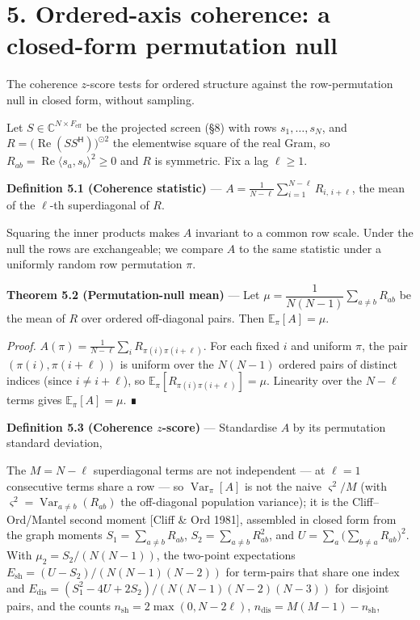 \documentclass[10pt,letterpaper,twocolumn]{article}
\begin{document}
\section{5. Ordered-axis coherence: a closed-form permutation null}\label{5-ordered-axis-coherence-a-closed-form-permutation-null}

The coherence \(z\)-score tests for ordered structure against the row-permutation null in closed form, without sampling.

Let \(S\in\mathbb{C}^{N\times F_{\mathrm{eff}}}\) be the projected screen (§8) with rows \(s_1,\dots,s_N\), and \(R=\big(\operatorname{Re}(SS^{\mathsf H})\big)^{\odot2}\) the elementwise square of the real Gram, so \(R_{ab}=\operatorname{Re}\langle s_a,s_b\rangle^2\ge0\) and \(R\) is symmetric. Fix a lag \(\ell\ge1\).

\textbf{Definition 5.1 (Coherence statistic)} --- \(\textstyle A=\frac1{N-\ell}\sum_{i=1}^{N-\ell}R_{i,\,i+\ell}\), the mean of the \(\ell\)-th superdiagonal of \(R\).

Squaring the inner products makes \(A\) invariant to a common row scale. Under the null the rows are exchangeable; we compare \(A\) to the same statistic under a uniformly random row permutation \(\pi\).

\textbf{Theorem 5.2 (Permutation-null mean)} --- Let \(\mu=\dfrac1{N(N-1)}\sum_{a\ne b}R_{ab}\) be the mean of \(R\) over ordered off-diagonal pairs. Then \(\mathbb{E}_\pi[A]=\mu\).

\emph{Proof.} \(A(\pi)=\frac1{N-\ell}\sum_i R_{\pi(i)\pi(i+\ell)}\). For each fixed \(i\) and uniform \(\pi\), the pair \((\pi(i),\pi(i+\ell))\) is uniform over the \(N(N-1)\) ordered pairs of distinct indices (since \(i\ne i+\ell\)), so \(\mathbb{E}_\pi[R_{\pi(i)\pi(i+\ell)}]=\mu\). Linearity over the \(N-\ell\) terms gives \(\mathbb{E}_\pi[A]=\mu\). ∎

\textbf{Definition 5.3 (Coherence \(z\)-score)} --- Standardise \(A\) by its permutation standard deviation,


The \(M=N-\ell\) superdiagonal terms are not independent --- at \(\ell=1\) consecutive terms share a row --- so \(\operatorname{Var}_\pi[A]\) is not the naive \(\varsigma^2/M\) (with \(\varsigma^2=\operatorname{Var}_{a\ne b}(R_{ab})\) the off-diagonal population variance); it is the Cliff--Ord/Mantel second moment {[}Cliff \& Ord 1981{]}, assembled in closed form from the graph moments \(S_1=\sum_{a\ne b}R_{ab}\), \(S_2=\sum_{a\ne b}R_{ab}^2\), and \(U=\sum_a\big(\sum_{b\ne a}R_{ab}\big)^2\). With \(\mu_2=S_2/(N(N-1))\), the two-point expectations \(E_{\mathrm{sh}}=(U-S_2)/(N(N-1)(N-2))\) for term-pairs that share one index and \(E_{\mathrm{dis}}=(S_1^2-4U+2S_2)/(N(N-1)(N-2)(N-3))\) for disjoint pairs, and the counts \(n_{\mathrm{sh}}=2\max(0,N-2\ell)\), \(n_{\mathrm{dis}}=M(M-1)-n_{\mathrm{sh}}\),
\end{document}

